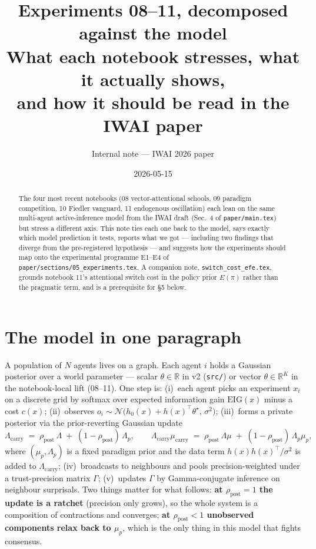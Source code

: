\documentclass[11pt,a4paper]{article}
\title{Experiments 08--11, decomposed against the model\\[2pt]
\large What each notebook stresses, what it actually shows,\\
and how it should be read in the IWAI paper}
\author{Internal note --- IWAI 2026 paper}
\date{2026-05-15}
\theoremstyle{plain}
\begin{document}
\maketitle

\begin{abstract}
The four most recent notebooks (08 vector-attentional schools, 09
paradigm competition, 10 Fiedler vanguard, 11 endogenous oscillation)
each lean on the same multi-agent active-inference model from the IWAI
draft (Sec.~4 of \texttt{paper/main.tex}) but stress a different axis.
This note ties each one back to the model, says exactly which model
prediction it tests, reports what we got --- including two findings that
diverge from the pre-registered hypothesis --- and suggests how the
experiments should map onto the experimental programme E1--E4 of
\texttt{paper/sections/05\_experiments.tex}. A companion note,
\texttt{switch\_cost\_efe.tex}, grounds notebook 11's attentional switch
cost in the policy prior $E(\pi)$ rather than the pragmatic term, and is
a prerequisite for §5 below.
\end{abstract}

\section{The model in one paragraph}
\label{sec:model}

A population of $N$ agents lives on a graph. Each agent $i$ holds a
Gaussian posterior over a world parameter --- scalar $\theta\in\mathbb{R}$
in v2 (\texttt{src/}) or vector $\theta\in\mathbb{R}^K$ in the
notebook-local lift (08--11). One step is: (i)~each agent picks an
experiment $x_i$ on a discrete grid by softmax over expected
information gain $\mathrm{EIG}(x)$ minus a cost $c(x)$; (ii)~observes
$o_i\sim\mathcal{N}\!\big(h_0(x)+h(x)^\top\theta^\star,\,\sigma^2\big)$;
(iii)~forms a private posterior via the prior-reverting Gaussian update
\begin{equation}
\Lambda_{\text{carry}} \;=\; \rho_{\text{post}}\,\Lambda \;+\; (1-\rho_{\text{post}})\,\Lambda_p,
\qquad
\Lambda_{\text{carry}}\mu_{\text{carry}} \;=\; \rho_{\text{post}}\,\Lambda\mu \;+\; (1-\rho_{\text{post}})\,\Lambda_p\mu_p,
\label{eq:forget}
\end{equation}
where $(\mu_p,\Lambda_p)$ is a fixed paradigm prior and the data term
$h(x)h(x)^\top/\sigma^2$ is added to $\Lambda_{\text{carry}}$;
(iv)~broadcasts to neighbours and pools precision-weighted under a
trust-precision matrix $\Gamma$; (v)~updates $\Gamma$ by
Gamma-conjugate inference on neighbour surprisals. Two things matter
for what follows: \textbf{at $\rho_{\text{post}}=1$ the update is a
ratchet} (precision only grows), so the whole system is a composition
of contractions and converges; \textbf{at $\rho_{\text{post}}<1$
unobserved components relax back to $\mu_p$}, which is the only thing in
this model that fights consensus.
\end{document}

